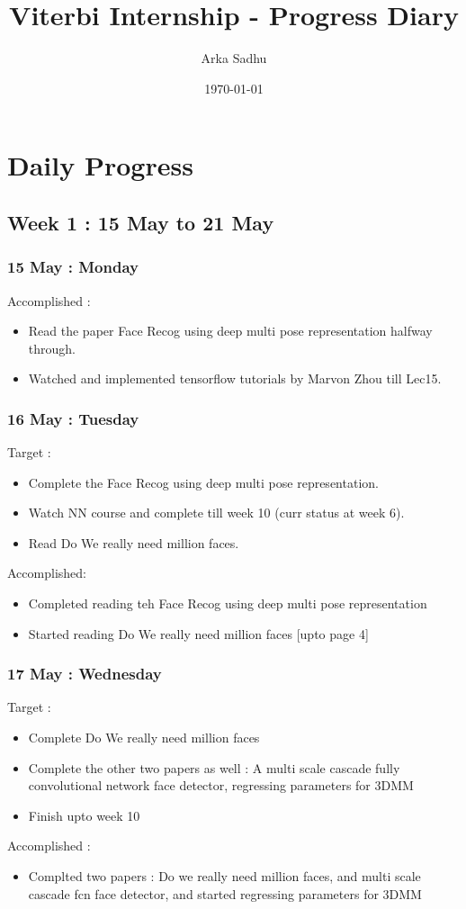 \documentclass{article}
\title{Viterbi Internship - Progress Diary}
\author{
  Arka Sadhu}
\date{\today}
\begin{document}
\maketitle

\tableofcontents
\newpage
\section{Daily Progress}
\subsection{Week 1 : 15 May to 21 May}
\subsubsection{15 May : Monday}
Accomplished :
\begin{itemize}
\item Read the paper Face Recog using deep multi pose representation halfway through.
\item Watched and implemented tensorflow tutorials by Marvon Zhou till Lec15.
\end{itemize}

\subsubsection{16 May : Tuesday}
Target :
\begin{itemize}
\item Complete the Face Recog using deep multi pose representation.
\item Watch NN course  and complete till week 10 (curr status at week 6).
\item Read Do We really need million faces.
\end{itemize}
Accomplished:
\begin{itemize}
\item Completed reading teh Face Recog using deep multi pose representation
\item Started reading Do We really need million faces [upto page 4]
\end{itemize}

\subsubsection{17 May : Wednesday}
Target :
\begin{itemize}
\item Complete Do We really need million faces
\item Complete the other two papers as well : A multi scale cascade fully convolutional network face detector, regressing parameters for 3DMM
\item Finish upto week 10
\end{itemize}
Accomplished :
\begin{itemize}
\item Complted two papers : Do we really need million faces, and multi scale cascade fcn face detector, and started regressing parameters for 3DMM
\end{itemize}
\end{document}
